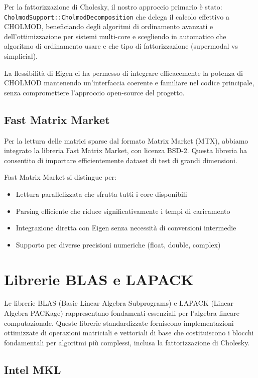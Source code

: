 Per la fattorizzazione di Cholesky, il nostro approccio primario è stato:
\texttt{CholmodSupport::CholmodDecomposition} che delega il calcolo effettivo a CHOLMOD, beneficiando degli algoritmi di ordinamento 
avanzati e dell'ottimizzazione per sistemi multi-core e scegliendo in automatico che algoritmo di ordinamento usare e che tipo di fattorizzazione
(supermodal vs simplicial).

La flessibilità di Eigen ci ha permesso di integrare efficacemente la potenza di CHOLMOD mantenendo un'interfaccia coerente e familiare nel codice principale, senza compromettere l'approccio open-source del progetto.

\subsection{Fast Matrix Market}
Per la lettura delle matrici sparse dal formato Matrix Market (MTX), abbiamo integrato la libreria Fast Matrix Market, con licenza BSD-2. 
Questa libreria ha consentito di importare efficientemente dataset di test di grandi dimensioni.

Fast Matrix Market si distingue per:
\begin{itemize}
    \item Lettura parallelizzata che sfrutta tutti i core disponibili
    \item Parsing efficiente che riduce significativamente i tempi di caricamento
    \item Integrazione diretta con Eigen senza necessità di conversioni intermedie
    \item Supporto per diverse precisioni numeriche (float, double, complex)
\end{itemize}

\section{Librerie BLAS e LAPACK}

Le librerie BLAS (Basic Linear Algebra Subprograms) e LAPACK (Linear Algebra PACKage) rappresentano fondamenti essenziali per l'algebra 
lineare computazionale. Queste librerie standardizzate forniscono implementazioni ottimizzate di operazioni matriciali e vettoriali 
di base che costituiscono i blocchi fondamentali per algoritmi più complessi, inclusa la fattorizzazione di Cholesky.

\subsection{Intel MKL}

